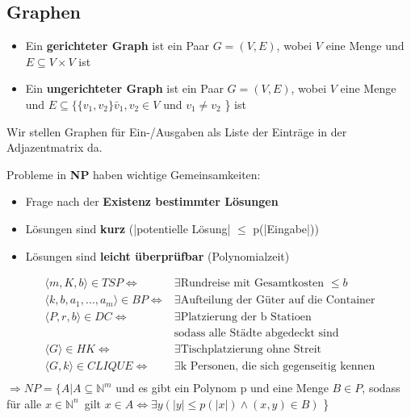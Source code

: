 \documentclass[14pt]{article}
\begin{document}
\subsection*{Graphen}
\begin{definition}[Graph]
    \begin{itemize}
        \item Ein \textbf{gerichteter Graph} ist ein Paar $G = (V, E)$, wobei $V$ 
        eine Menge und $E \subseteq V \times V$ ist
        \item Ein \textbf{ungerichteter Graph} ist ein Paar $G = (V, E)$, wobei $V$ 
        eine Menge und $E \subseteq \{ \{ v_1, v_2\} \bar v_1, v_2 \in V$ und $v_1 \neq v_2$ \} ist
    \end{itemize}
    Wir stellen Graphen für Ein-/Ausgaben als Liste der Einträge in der 
    Adjazentmatrix da.
\end{definition}
\begin{definition} [NP = Nichtdeterministische Polynomialzeit]
    Probleme in \textbf{NP} haben wichtige Gemeinsamkeiten:
    \begin{itemize}
        \item Frage nach der \textbf{Existenz bestimmter Lösungen}
        \item Lösungen sind \textbf{kurz} (|potentielle Lösung| $\leq$ p(|Eingabe|))
        \item Lösungen sind \textbf{leicht überprüfbar} (Polynomialzeit)
    \end{itemize}
    \begin{equation*}
        \begin{split}
            \langle m, K, b \rangle \in TSP \Leftrightarrow & \exists 
            \text{Rundreise mit Gesamtkosten } \leq b \\
            \langle k, b, a_1, \dots, a_m \rangle \in BP \Leftrightarrow & \exists
            \text{Aufteilung der Güter auf die Container} \\
            \langle P, r, b \rangle \in DC \Leftrightarrow & \exists
            \text{Platzierung der b Statioen} \\ &
            \text{sodass alle Städte abgedeckt sind} \\
            \langle G \rangle \in HK \Leftrightarrow & \exists
            \text{Tischplatzierung ohne Streit} \\
            \langle G, k \rangle \in CLIQUE \Leftrightarrow & \exists
            \text{k Personen, die sich gegenseitig kennen} \\
        \end{split}        
    \end{equation*}
    $\Rightarrow NP = \{ A | A \subseteq \mathbb{N}^m$ und es gibt ein Polynom p und eine Menge 
    $B \in P$, sodass für alle $x \in \mathbb{N}^n$\ gilt $x \in A \Leftrightarrow 
    \exists y(|y| \leq p(|x|) \land (x, y) \in B)$ \}
\end{definition}
\end{document}
